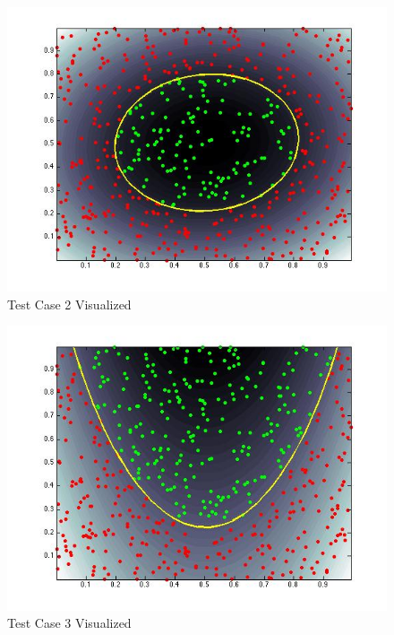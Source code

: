 \documentclass{article}
\begin{document}
\begin{figure}[!htbp]
\begin{center}
\includegraphics[width=1.0\textwidth]{testcase2.jpg} %
\caption{Test Case 2 Visualized}
\end{center}
\end{figure}

\begin{figure}[!htbp]
\begin{center}
\includegraphics[width=1.0\textwidth]{testcase3.jpg} %
\caption{Test Case 3 Visualized}
\end{center}
\end{figure}
\end{document}
